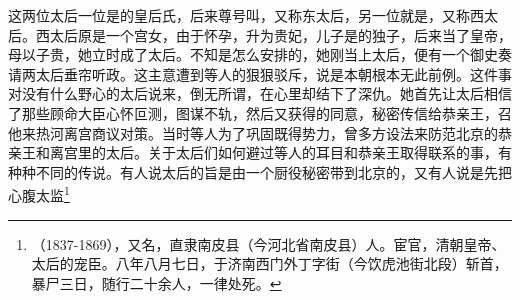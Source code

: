 这两位太后一位是的皇后氏，后来尊号叫，又称东太后，另一位就是，又称西太后。西太后原是一个宫女，由于怀孕，升为贵妃，儿子是的独子，后来当了皇帝，母以子贵，她立时成了太后。不知是怎么安排的，她刚当上太后，便有一个御史奏请两太后垂帘听政。这主意遭到等人的狠狠驳斥，说是本朝根本无此前例。这件事对没有什么野心的太后说来，倒无所谓，在心里却结下了深仇。她首先让太后相信了那些顾命大臣心怀叵测，图谋不轨，然后又获得的同意，秘密传信给恭亲王，召他来热河离宫商议对策。当时等人为了巩固既得势力，曾多方设法来防范北京的恭亲王和离宫里的太后。关于太后们如何避过等人的耳目和恭亲王取得联系的事，有种种不同的传说。有人说太后的旨是由一个厨役秘密带到北京的，又有人说是先把心腹太监\footnote{（1837-1869），又名，直隶南皮县（今河北省南皮县）人。宦官，清朝皇帝、太后的宠臣。八年八月七日，于济南西门外丁字街（今饮虎池街北段）斩首，暴尸三日，随行二十余人，一律处死。
}
